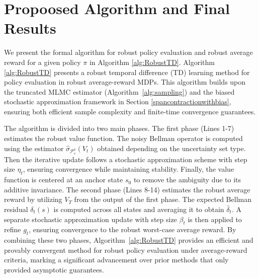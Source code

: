 \section{Propoosed Algorithm and Final Results}
We present the formal algorithm for robust policy evaluation and robust average reward for a given policy $\pi$ in Algorithm \ref{alg:RobustTD}. Algorithm \ref{alg:RobustTD} presents a robust temporal difference (TD) learning method for policy evaluation in robust average-reward MDPs. This algorithm builds upon the truncated MLMC estimator (Algorithm~\ref{alg:sampling}) and the biased stochastic approximation framework in Section \ref{spancontractionwithbias}, ensuring both efficient 
sample complexity and finite-time convergence guarantees.

The algorithm is divided into two main phases. The first phase (Lines 1-7) estimates the robust value function. The noisy Bellman operator is computed using the estimator $\hat{\sigma}_{\mathcal{P}_s^a}(V_t)$ obtained depending on the uncertainty set type. Then the iterative update follows a stochastic approximation scheme with step size $\eta_t$, ensuring convergence while maintaining stability. Finally, the value function is centered at an anchor state $s_0$ to remove the ambiguity due to its additive invariance. The second phase (Lines 8-14) estimates the robust average reward by utilizing $V_T$ from the output of the first phase. The expected Bellman residual  $\delta_t(s)$ is computed across all states and averaging it to obtain $\bar{\delta}_t$. A separate stochastic approximation update with step size $\beta_t$ is then applied to refine $g_t$, ensuring convergence to the robust worst-case average reward. By combining these two phases, Algorithm~\ref{alg:RobustTD} provides an efficient and provably 
convergent method for robust policy evaluation under average-reward criteria, marking 
a significant advancement over prior methods that only provided asymptotic guarantees. 

